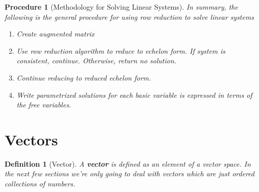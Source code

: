 \documentclass[12pt]{report}
\newtheorem{dfn}{Definition}
\newtheorem{proc}{Procedure}
\begin{document}
\begin{proc}[Methodology for Solving Linear Systems]

In summary, the following is the general procedure for using row reduction to solve linear systems

\begin{enumerate}
\item Create augmented matrix
\item Use row reduction algorithm to reduce to echelon form. If system is consistent, continue. Otherwise, return no solution.
\item Continue reducing to reduced echelon form.
\item Write parametrized solutions for each basic variable is expressed in terms of the free variables.
\end{enumerate}
\end{proc}

\section{Vectors}

\begin{dfn}[Vector]
A \textbf{vector} is defined as an element of a vector space. In the next few sections we're only going to deal with vectors which are just ordered collections of numbers.
\end{dfn}
\end{document}
